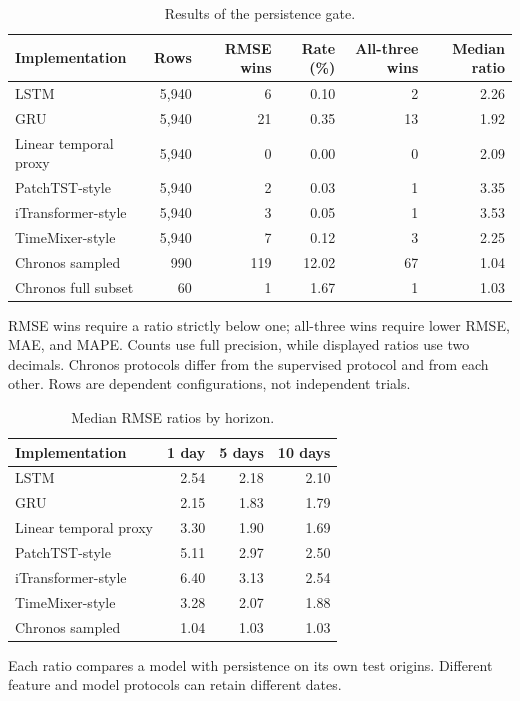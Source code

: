 \begin{table}[htbp]
\centering
\caption{Results of the persistence gate.}
\label{tab:model_gate_summary}
\small
\setlength{\tabcolsep}{4pt}
\begin{tabular}{lrrrrr}
\toprule
Implementation & Rows & RMSE wins & Rate (\%) & All-three wins & Median ratio \\
\midrule
LSTM & 5,940 & 6 & 0.10 & 2 & 2.26 \\
GRU & 5,940 & 21 & 0.35 & 13 & 1.92 \\
Linear temporal proxy & 5,940 & 0 & 0.00 & 0 & 2.09 \\
PatchTST-style & 5,940 & 2 & 0.03 & 1 & 3.35 \\
iTransformer-style & 5,940 & 3 & 0.05 & 1 & 3.53 \\
TimeMixer-style & 5,940 & 7 & 0.12 & 3 & 2.25 \\
Chronos sampled & 990 & 119 & 12.02 & 67 & 1.04 \\
Chronos full subset & 60 & 1 & 1.67 & 1 & 1.03 \\
\bottomrule
\end{tabular}
\par\smallskip\parbox{0.97\linewidth}{\footnotesize RMSE wins require a ratio strictly below one; all-three wins require lower RMSE, MAE, and MAPE. Counts use full precision, while displayed ratios use two decimals. Chronos protocols differ from the supervised protocol and from each other. Rows are dependent configurations, not independent trials.}
\end{table}

\begin{table}[htbp]
\centering
\caption{Median RMSE ratios by horizon.}
\label{tab:horizon_summary}
\small
\setlength{\tabcolsep}{4pt}
\begin{tabular}{lrrr}
\toprule
Implementation & 1 day & 5 days & 10 days \\
\midrule
LSTM & 2.54 & 2.18 & 2.10 \\
GRU & 2.15 & 1.83 & 1.79 \\
Linear temporal proxy & 3.30 & 1.90 & 1.69 \\
PatchTST-style & 5.11 & 2.97 & 2.50 \\
iTransformer-style & 6.40 & 3.13 & 2.54 \\
TimeMixer-style & 3.28 & 2.07 & 1.88 \\
Chronos sampled & 1.04 & 1.03 & 1.03 \\
\bottomrule
\end{tabular}
\par\smallskip\parbox{0.97\linewidth}{\footnotesize Each ratio compares a model with persistence on its own test origins. Different feature and model protocols can retain different dates.}
\end{table}
